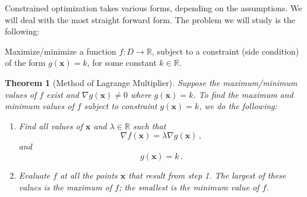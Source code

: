 \documentclass[
]{book}
\newtheorem{theorem}{Theorem}[chapter]
\theoremstyle{definition}
\theoremstyle{definition}
\theoremstyle{definition}
\theoremstyle{definition}
\theoremstyle{remark}
\begin{document}
Constrained optimization takes various forms, depending on the assumptions.
We will deal with the most straight forward form.
The problem we will study is the following:

Maximize/minimize a function \(f:D\to \mathbb{R}\), subject to a constraint (side condition)
of the form
\(g(\mathbf{x}) = k\), for some constant \(k\in \mathbb{R}\).

\begin{theorem}[Method of Lagrange Multiplier]

Suppose the maximum/minimum values of \(f\) exist and \(\nabla g(\mathbf{x}) \not=0\) where \(g(\mathbf{x}) = k\).
To find the maximum and minimum values of \(f\) subject to constraint
\(g(\mathbf{x}) = k\), we do the following:

\begin{enumerate}
\def\labelenumi{\arabic{enumi}.}
\item
  Find all values of \(\mathbf{x}\) and \(\lambda \in \mathbb{R}\) such that
  \begin{equation*}
   \nabla f(\mathbf{x}) =\lambda \nabla g(\mathbf{x})\,,
  \end{equation*}
  and
  \begin{equation*}
   g(\mathbf{x}) = k \,.
  \end{equation*}
\item
  Evaluate \(f\) at all the points \(\mathbf{x}\) that result from step 1. The largest of
  these values is the maximum of \(f\); the smallest is the minimum value of \(f\).
\end{enumerate}

\end{theorem}
\end{document}
